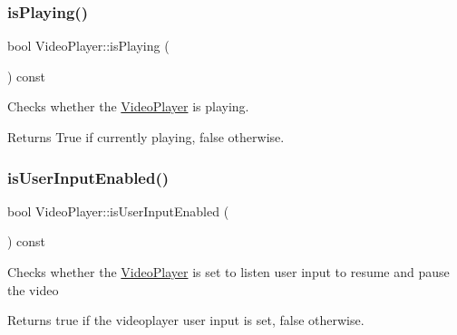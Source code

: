\subsubsection{\texorpdfstring{is\+Playing()}{isPlaying()}\hspace{0.1cm}{\footnotesize\ttfamily [2/2]}}
{\footnotesize\ttfamily bool Video\+Player\+::is\+Playing (\begin{DoxyParamCaption}{ }\end{DoxyParamCaption}) const\hspace{0.3cm}{\ttfamily [virtual]}}

Checks whether the \hyperlink{classexperimental_1_1ui_1_1VideoPlayer}{Video\+Player} is playing.

\begin{DoxyReturn}{Returns}
True if currently playing, false otherwise. 
\end{DoxyReturn}
\mbox{\label{classexperimental_1_1ui_1_1VideoPlayer_a6fe34ddb8d9cb2774d9097ff1ea68c47}} 
\subsubsection{\texorpdfstring{is\+User\+Input\+Enabled()}{isUserInputEnabled()}}
{\footnotesize\ttfamily bool Video\+Player\+::is\+User\+Input\+Enabled (\begin{DoxyParamCaption}{ }\end{DoxyParamCaption}) const\hspace{0.3cm}{\ttfamily [virtual]}}

Checks whether the \hyperlink{classexperimental_1_1ui_1_1VideoPlayer}{Video\+Player} is set to listen user input to resume and pause the video

\begin{DoxyReturn}{Returns}
true if the videoplayer user input is set, false otherwise. 
\end{DoxyReturn}
\mbox{\label{classexperimental_1_1ui_1_1VideoPlayer_a88b4f377554bef7bca9c974c30dac91b}} 
